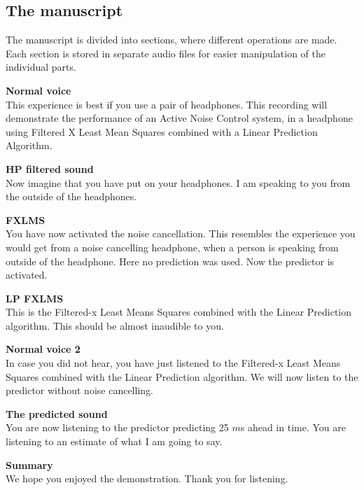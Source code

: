 \subsection{The manuscript}
The manuscript is divided into sections, where different operations are made. Each section is stored in separate audio files for easier manipulation of the individual parts. 
 

\textbf{Normal voice}\\
This experience is best if you use a pair of headphones. 
This recording will demonstrate the performance of an Active Noise Control  system, in a headphone using Filtered X Least Mean Squares combined with a Linear Prediction Algorithm. 

\textbf{HP filtered sound}\\
Now imagine that you have put on your headphones. I am speaking to you from the outside of the headphones.

\textbf{FXLMS}\\
You have now activated the noise cancellation. This resembles the experience you would get from a noise cancelling headphone, when a person is speaking from outside of the headphone. 
Here no prediction was used. Now the predictor is activated. 

\textbf{LP FXLMS}\\
This is the Filtered-x Least Means Squares combined with the Linear Prediction algorithm. This should be almost inaudible to you. 

\textbf{Normal voice 2}\\
In case you did not hear, you have just listened to the Filtered-x Least Means Squares combined with the Linear Prediction algorithm. We will now listen to the predictor without noise cancelling.

\textbf{The predicted sound}\\
You are now listening to the predictor predicting 25 $m$s ahead in time. You are listening to an estimate of what I am going to say.  

\textbf{Summary}\\
We hope you enjoyed the demonstration. Thank you for listening.\\\\

